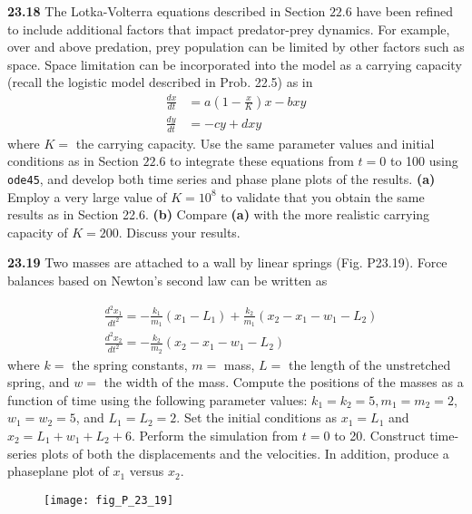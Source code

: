 \documentclass[../main.tex]{subfiles}
\begin{document}
\noindent\textbf{23.18} The Lotka-Volterra equations described in Section $22.6$ have been refined to include additional factors that impact predator-prey dynamics. For example, over and above predation, prey population can be limited by other factors such as space. Space limitation can be incorporated into the model as a carrying capacity (recall the logistic model described in Prob. 22.5) as in
$$
\begin{aligned}
\frac{d x}{d t} &=a\left(1-\frac{x}{K}\right) x-b x y \\
\frac{d y}{d t} &=-c y+d x y
\end{aligned}
$$
where $K=$ the carrying capacity. Use the same parameter values and initial conditions as in Section $22.6$ to integrate these equations from $t=0$ to 100 using \texttt{ode45}, and develop both time series and phase plane plots of the results.
\textbf{(a)} Employ a very large value of $K=10^{8}$ to validate that you obtain the same results as in Section 22.6.
\textbf{(b)} Compare \textbf{(a)} with the more realistic carrying capacity of $K=200$. Discuss your results.\vspace{2mm}

\noindent\textbf{23.19} Two masses are attached to a wall by linear springs (Fig. P23.19). Force balances based on Newton's second law can be written as

$$
\begin{aligned}
&\frac{d^{2} x_{1}}{d t^{2}}=-\frac{k_{1}}{m_{1}}\left(x_{1}-L_{1}\right)+\frac{k_{2}}{m_{1}}\left(x_{2}-x_{1}-w_{1}-L_{2}\right) \\
&\frac{d^{2} x_{2}}{d t^{2}}=-\frac{k_{2}}{m_{2}}\left(x_{2}-x_{1}-w_{1}-L_{2}\right)
\end{aligned}
$$
where $k=$ the spring constants, $m=$ mass, $L=$ the length of the unstretched spring, and $w=$ the width of the mass. Compute the positions of the masses as a function of time using the following parameter values: $k_{1}=k_{2}=5, m_{1}=m_{2}=2$, $w_{1}=w_{2}=5$, and $L_{1}=L_{2}=2$.
Set the initial conditions as $x_{1}=L_{1}$ and $x_{2}=L_{1}+w_{1}+L_{2}+6$. Perform the simulation from $t=0$ to 20. Construct time-series plots of both the displacements and the velocities. In addition, produce a phaseplane plot of $x_{1}$ versus $x_{2}$.\vspace{2mm}

\begin{figure}[H]
    \centering
    \texttt{[image: fig\_P\_23\_19]}
    \label{fig:fig_P_23_19}
\end{figure}\vspace{2mm}
\end{document}
